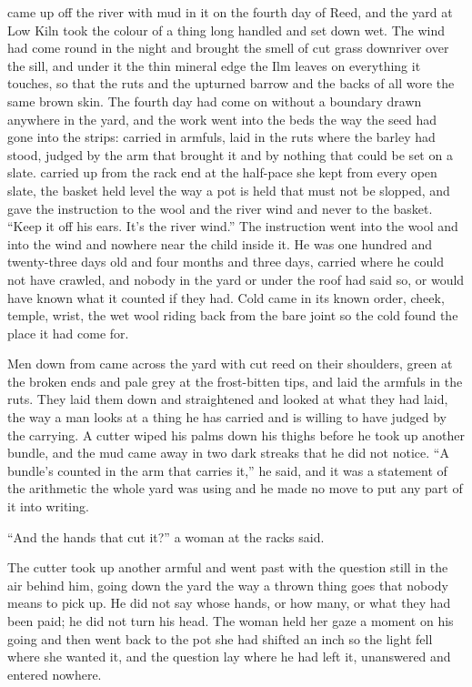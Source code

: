 
 came up off the river with mud in it on the fourth day of Reed, and the yard at Low Kiln took the colour of a thing long handled and set down wet. The wind had come round in the night and brought the smell of cut grass downriver over the sill, and under it the thin mineral edge the Ilm leaves on everything it touches, so that the ruts and the upturned barrow and the backs of  all wore the same brown skin. The fourth day had come on without a boundary drawn anywhere in the yard, and the work went into the beds the way the seed had gone into the strips: carried in armfuls, laid in the ruts where the barley had stood, judged by the arm that brought it and by nothing that could be set on a slate.  carried  up from the rack end at the half-pace she kept from every open slate, the basket held level the way a pot is held that must not be slopped, and gave the instruction to the wool and the river wind and never to the basket. “Keep it off his ears. It's the river wind.” The instruction went into the wool and into the wind and nowhere near the child inside it. He was one hundred and twenty-three days old and four months and three days, carried where he could not have crawled, and nobody in the yard or under the roof had said so, or would have known what it counted if they had. Cold came in its known order, cheek, temple, wrist, the wet wool riding back from the bare joint so the cold found the place it had come for.

Men down from  came across the yard with cut reed on their shoulders, green at the broken ends and pale grey at the frost-bitten tips, and laid the armfuls in the ruts. They laid them down and straightened and looked at what they had laid, the way a man looks at a thing he has carried and is willing to have judged by the carrying. A cutter wiped his palms down his thighs before he took up another bundle, and the mud came away in two dark streaks that he did not notice. “A bundle's counted in the arm that carries it,” he said, and it was a statement of the arithmetic the whole yard was using and he made no move to put any part of it into writing.

“And the hands that cut it?” a woman at the racks said.

The cutter took up another armful and went past with the question still in the air behind him, going down the yard the way a thrown thing goes that nobody means to pick up. He did not say whose hands, or how many, or what they had been paid; he did not turn his head. The woman held her gaze a moment on his going and then went back to the pot she had shifted an inch so the light fell where she wanted it, and the question lay where he had left it, unanswered and entered nowhere.

